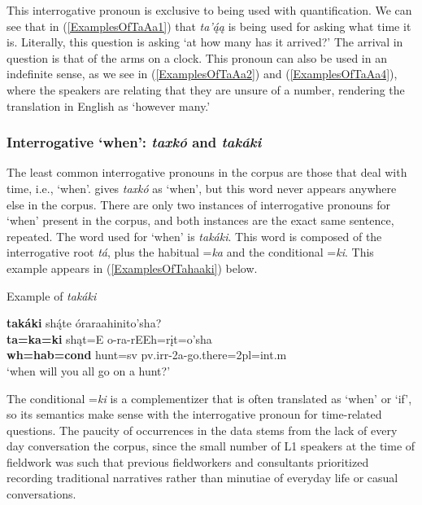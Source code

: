 This interrogative pronoun is exclusive to being used with quantification. We can see that in (\ref{ExamplesOfTaAa1}) that \textit{ta'ą́ą} is being used for asking what time it is. Literally, this question is asking `at how many has it arrived?' The arrival in question is that of the arms on a clock. This pronoun can also be used in an indefinite sense, as we see in (\ref{ExamplesOfTaAa2}) and (\ref{ExamplesOfTaAa4}), where the speakers are relating that they are unsure of a number, rendering the translation in English as `however many.'

\subsubsection{Interrogative `when': \textit{taxkó} and \textit{takáki}}\label{SubSubSecTahaaki}

The least common interrogative pronouns in the corpus are those that deal with time, i.e., `when'. \citet[483]{hollow1970} gives \textit{taxkó} as `when', but this word never appears anywhere else in the corpus. There are only two instances of interrogative pronouns for `when' present in the corpus, and both instances are the exact same sentence, repeated. The word used for `when' is \textit{takáki}. This word is composed of the interrogative root \textit{tá}, plus the habitual =\textit{ka} and the conditional =\textit{ki}. This example appears in (\ref{ExamplesOfTahaaki}) below.

\begin{exe}

\item\label{ExamplesOfTahaaki} Example of \textit{takáki}



    \glll \textbf{takáki} shą́te óraraahinito'sha?\\
    \textbf{ta=ka=ki} shąt=E o-ra-rEEh=rįt=o'sha\\
    \textbf{wh=hab=cond} \textnormal{hunt}=sv pv.irr-2a-\textnormal{go.there}=2pl=int.m\\
    \glt `when will you all go on a hunt?' \citep[140]{hollow1973b}



\end{exe}

The conditional =\textit{ki} is a complementizer that is often translated as `when' or `if', so its semantics make sense with the interrogative pronoun for time-related questions. The paucity of occurrences in the data stems from the lack of every day conversation the corpus, since the small number of L1 speakers at the time of fieldwork was such that previous fieldworkers and consultants prioritized recording traditional narratives rather than minutiae of everyday life or casual conversations.

